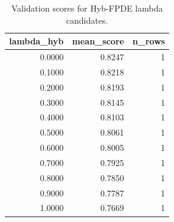 \begin{table}[t]
\caption{Validation scores for Hyb-FPDE lambda candidates.}
\label{tab:lambda_distribution_computed}
\centering
\begin{tabular}{rrr}
\toprule
lambda\_hyb & mean\_score & n\_rows \\
\midrule
0.0000 & 0.8247 & 1 \\
0.1000 & 0.8218 & 1 \\
0.2000 & 0.8193 & 1 \\
0.3000 & 0.8145 & 1 \\
0.4000 & 0.8103 & 1 \\
0.5000 & 0.8061 & 1 \\
0.6000 & 0.8005 & 1 \\
0.7000 & 0.7925 & 1 \\
0.8000 & 0.7850 & 1 \\
0.9000 & 0.7787 & 1 \\
1.0000 & 0.7669 & 1 \\
\bottomrule
\end{tabular}

\end{table}
